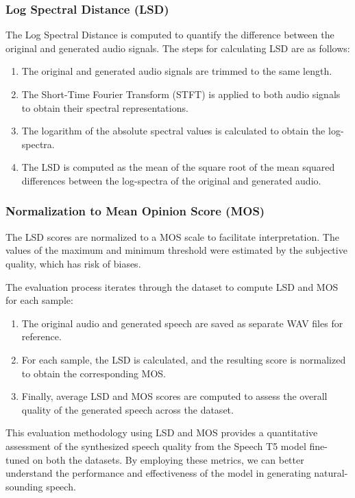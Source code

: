 \documentclass[conference]{IEEEtran}
\begin{document}
\subsubsection{Log Spectral Distance (LSD)}
The Log Spectral Distance is computed to quantify the difference between the original and generated audio signals. The steps for calculating LSD are as follows:
\begin{enumerate}
    \item The original and generated audio signals are trimmed to the same length.
    \item The Short-Time Fourier Transform (STFT) is applied to both audio signals to obtain their spectral representations.
    \item The logarithm of the absolute spectral values is calculated to obtain the log-spectra.
    \item The LSD is computed as the mean of the square root of the mean squared differences between the log-spectra of the original and generated audio.
\end{enumerate}

\subsubsection{Normalization to Mean Opinion Score (MOS)}
The LSD scores are normalized to a MOS scale to facilitate interpretation. The values of the maximum and minimum threshold were estimated by the subjective quality, which has risk of biases.

The evaluation process iterates through the dataset to compute LSD and MOS for each sample:
\begin{enumerate}
    \item The original audio and generated speech are saved as separate WAV files for reference.
    \item For each sample, the LSD is calculated, and the resulting score is normalized to obtain the corresponding MOS.
    \item Finally, average LSD and MOS scores are computed to assess the overall quality of the generated speech across the dataset.
\end{enumerate}

This evaluation methodology using LSD and MOS provides a quantitative assessment of the synthesized speech quality from the Speech T5 model fine-tuned on both the datasets. By employing these metrics, we can better understand the performance and effectiveness of the model in generating natural-sounding speech.
\end{document}
